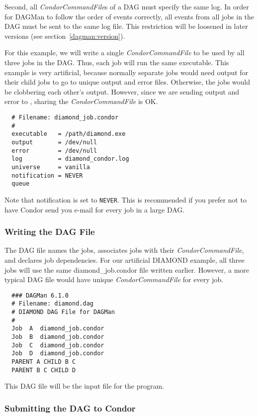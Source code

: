 Second, all \textit{CondorCommandFile}s of a DAG must specify the same log.
In order for DAGMan to follow the order of events correctly, all events from
all jobs in the DAG must be sent to the same log file.  This restriction will
be loosened in later versions (see section~\ref{dagman:version}).

For this example, we will write a single \textit{CondorCommandFile} to be used
by all three jobs in the DAG.  Thus, each job will run the same executable.
This example is very artificial, because normally separate jobs would need
output for their child jobs to go to unique output and error files.
Otherwise, the jobs would be clobbering each other's output.  However, since
we are sending output and error to , sharing the
\textit{CondorCommandFile} is OK.

\begin{verbatim}
  # Filename: diamond_job.condor
  #
  executable   = /path/diamond.exe
  output       = /dev/null
  error        = /dev/null
  log          = diamond_condor.log
  universe     = vanilla
  notification = NEVER
  queue
\end{verbatim}

Note that notification is set to \texttt{NEVER}.  This is recommended if you
prefer not to have Condor send you e-mail for every job in a large DAG.

\subsubsection{Writing the DAG File}
\label{dagman:writedag}

The DAG file names the jobs, associates jobs with their
\textit{CondorCommandFile}, and declares job dependencies.  For our artificial
DIAMOND example, all three jobs will use the same diamond\_job.condor file
written earlier.  However, a more typical DAG file would have unique
\textit{CondorCommandFile} for every job.

\begin{verbatim}
  ### DAGMan 6.1.0
  # Filename: diamond.dag
  # DIAMOND DAG File for DAGMan
  #
  Job  A  diamond_job.condor
  Job  B  diamond_job.condor
  Job  C  diamond_job.condor
  Job  D  diamond_job.condor
  PARENT A CHILD B C
  PARENT B C CHILD D
\end{verbatim}

This DAG file will be the input file for the  program.

\subsubsection{Submitting the DAG to Condor}
\label{dagman:submitdag}

